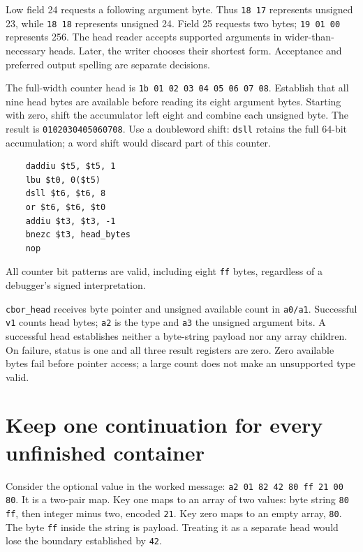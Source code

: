 

Low field 24 requests a following argument byte. Thus \texttt{18 17} represents
unsigned 23, while \texttt{18 18} represents unsigned 24. Field 25 requests two
bytes; \texttt{19 01 00} represents 256. The head reader accepts supported arguments
in wider-than-necessary heads. Later, the writer chooses their shortest form.
Acceptance and preferred output spelling are separate decisions.

The full-width counter head is \texttt{1b 01 02 03 04 05 06 07 08}. Establish
that all nine head bytes are available before reading its eight argument bytes.
Starting with zero, shift the accumulator left eight and combine each unsigned
byte. The result is \texttt{0102030405060708}. Use a doubleword shift:
\texttt{dsll} retains the full 64-bit accumulation; a word shift would discard
part of this counter.

\begin{verbatim}
    daddiu $t5, $t5, 1
    lbu $t0, 0($t5)
    dsll $t6, $t6, 8
    or $t6, $t6, $t0
    addiu $t3, $t3, -1
    bnezc $t3, head_bytes
    nop
\end{verbatim}

All counter bit patterns are valid, including eight
\texttt{ff} bytes, regardless of a debugger's signed interpretation.

\texttt{cbor\_head} receives byte pointer and unsigned available count in
\texttt{a0/a1}. Successful \texttt{v1} counts head bytes; \texttt{a2} is the type
and \texttt{a3} the unsigned argument bits. A successful head establishes neither
a byte-string payload nor any array children. On failure, status is one and all
three result registers are zero. Zero available bytes fail before pointer access;
a large count does not make an unsupported type valid.

\section{Keep one continuation for every unfinished container}

Consider the optional value in the worked message:
\texttt{a2 01 82 42 80 ff 21 00 80}. It is a two-pair map. Key one maps to an
array of two values: byte string \texttt{80 ff}, then integer minus two, encoded
\texttt{21}. Key zero maps to an empty array, \texttt{80}. The byte \texttt{ff}
inside the string is payload. Treating it as a separate head would lose the
boundary established by \texttt{42}.

